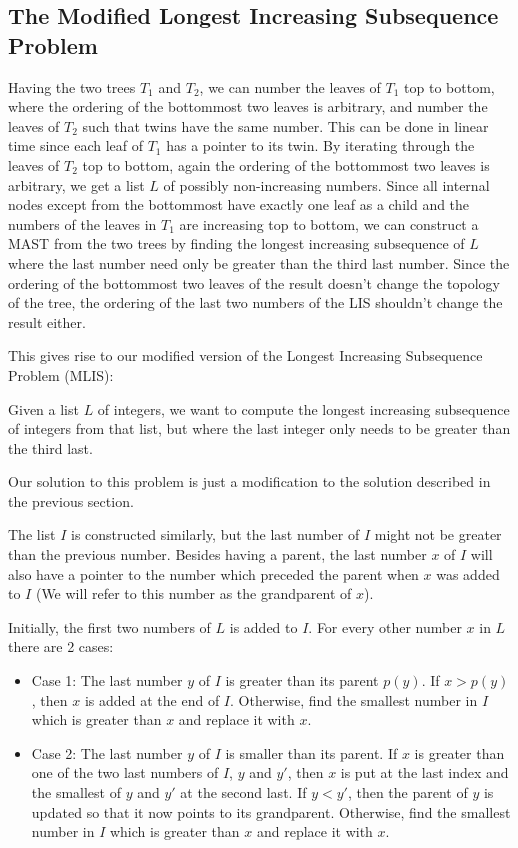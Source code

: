 \subsection{The Modified Longest Increasing Subsequence Problem}
Having the two trees $T_1$ and $T_2$, we can number the leaves of $T_1$ top to bottom, where the ordering of the bottommost two leaves is arbitrary, and number the leaves of $T_2$ such that twins have the same number. This can be done in linear time since each leaf of $T_1$ has a pointer to its twin. By iterating through the leaves of $T_2$ top to bottom, again the ordering of the bottommost two leaves is arbitrary, we get a list $L$ of possibly non-increasing numbers. Since all internal nodes except from the bottommost have exactly one leaf as a child and the numbers of the leaves in $T_1$ are increasing top to bottom, we can construct a MAST from the two trees by finding the longest increasing subsequence of $L$ where the last number need only be greater than the third last number. Since the ordering of the bottommost two leaves of the result doesn't change the topology of the tree, the ordering of the last two numbers of the LIS shouldn't change the result either.

This gives rise to our modified version of the Longest Increasing Subsequence Problem (MLIS):

Given a list $L$ of integers, we want to compute the longest increasing subsequence of integers from that list, but where the last integer only needs to be greater than the third last.

Our solution to this problem is just a modification to the solution described in the previous section.

The list $I$ is constructed similarly, but the last number of $I$ might not be greater than the previous number. Besides having a parent, the last number $x$ of $I$ will also have a pointer to the number which preceded the parent when $x$ was added to $I$ (We will refer to this number as the grandparent of $x$).

Initially, the first two numbers of $L$ is added to $I$. For every other number $x$ in $L$ there are 2 cases:

\begin{itemize}
	\item Case 1: The last number $y$ of $I$ is greater than its parent $p(y)$.
	\subitem If $x > p(y)$, then $x$ is added at the end of $I$.
	\subitem Otherwise, find the smallest number in $I$ which is greater than $x$ and replace it with $x$.
	\item Case 2: The last number $y$ of $I$ is smaller than its parent.
	\subitem If $x$ is greater than one of the two last numbers of $I$, $y$ and $y'$, then $x$ is put at the last index and the smallest of $y$ and $y'$ at the second last.
	\subsubitem If $y < y'$, then the parent of $y$ is updated so that it now points to its grandparent.
	\subitem Otherwise, find the smallest number in $I$ which is greater than $x$ and replace it with $x$.
\end{itemize}


